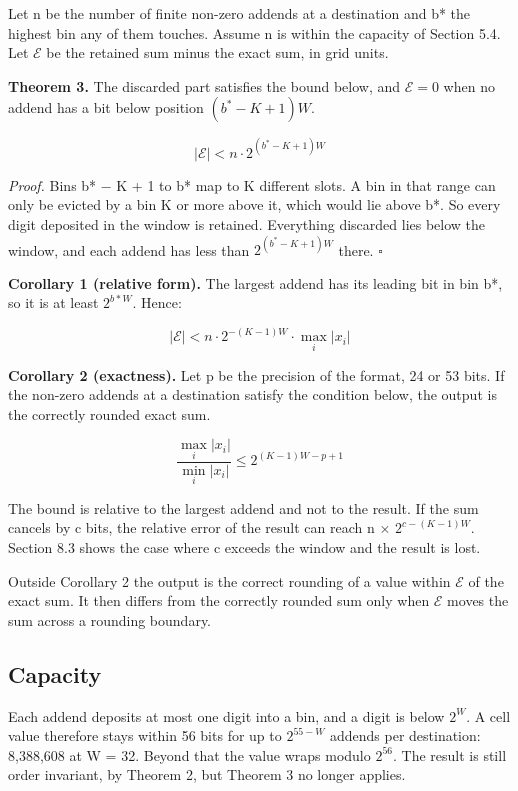 \documentclass[journal]{IEEEtran}
\providecommand{\mdlgwhtsquare}{\ensuremath{\square}}
\begin{document}
Let n be the number of finite non-zero addends at a destination and b*
the highest bin any of them touches. Assume n is within the capacity of
Section 5.4. Let \(\mathcal{E}\) be the retained sum minus the exact
sum, in grid units.

\textbf{Theorem 3.} The discarded part satisfies the bound below, and
\(\mathcal{E}=0\) when no addend has a bit below position
\((b^*-K+1)W\).

\[|\mathcal{E}| < n\cdot 2^{(b^*-K+1)W}\]

\emph{Proof.} Bins b* − K + 1 to b* map to K different slots. A bin in
that range can only be evicted by a bin K or more above it, which would
lie above b*. So every digit deposited in the window is retained.
Everything discarded lies below the window, and each addend has less
than \(2^{(b^*-K+1)W}\) there. \hfill$\mdlgwhtsquare$

\textbf{Corollary 1 (relative form).} The largest addend has its leading
bit in bin b*, so it is at least \(2^{b*W}\). Hence:

\[|\mathcal{E}| < n\cdot 2^{-(K-1)W}\cdot \max_i |x_i|\]

\textbf{Corollary 2 (exactness).} Let p be the precision of the format,
24 or 53 bits. If the non-zero addends at a destination satisfy the
condition below, the output is the correctly rounded exact sum.

\[\frac{\max_i |x_i|}{\min_i |x_i|} \le 2^{(K-1)W-p+1}\]

The bound is relative to the largest addend and not to the result. If
the sum cancels by c bits, the relative error of the result can reach n
× \(2^{c-(K-1)W}\). Section 8.3 shows the case where c exceeds the
window and the result is lost.

Outside Corollary 2 the output is the correct rounding of a value within
\(\mathcal{E}\) of the exact sum. It then differs from the correctly
rounded sum only when \(\mathcal{E}\) moves the sum across a rounding
boundary.

\hypertarget{capacity}{%
\subsection{Capacity}\label{capacity}}

Each addend deposits at most one digit into a bin, and a digit is below
\(2^W\). A cell value therefore stays within 56 bits for up to
\(2^{55−W}\) addends per destination: 8,388,608 at W = 32. Beyond that
the value wraps modulo \(2^{56}\). The result is still order invariant,
by Theorem 2, but Theorem 3 no longer applies.
\end{document}
